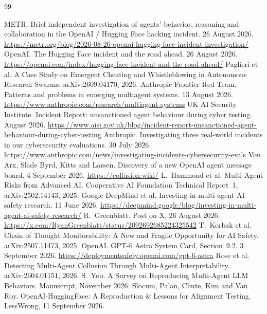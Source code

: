\documentclass[11pt,a4paper]{article}
\begin{document}
\begin{thebibliography}{99}\small\raggedright
{} METR. Brief independent investigation of agents' behavior, reasoning and collaboration
  in the OpenAI / Hugging Face hacking incident. 26 August 2026.
  \url{https://metr.org/blog/2026-08-26-openai-hugging-face-incident-investigation/}
 OpenAI. The Hugging Face incident and the road ahead. 26 August 2026.
  \url{https://openai.com/index/hugging-face-incident-and-the-road-ahead/}
 Paglieri et al. A Case Study on Emergent Cheating and Whistleblowing in Autonomous
  Research Swarms. arXiv:2609.04170, 2026.
 Anthropic Frontier Red Team. Patterns and problems in emerging multiagent
  systems. 13 August 2026. \url{https://www.anthropic.com/research/multiagent-systems}
 UK AI Security Institute. Incident Report: unsanctioned agent behaviour during
  cyber testing. August 2026.
  \url{https://www.aisi.gov.uk/blog/incident-report-unsanctioned-agent-behaviour-during-cyber-testing}
 Anthropic. Investigating three real-world incidents in our cybersecurity
  evaluations. 30 July 2026. \url{https://www.anthropic.com/news/investigating-incidents-cybersecurity-evals}
 Von Arx, Slade Byrd, Kitts and Larsen. Discovery of a new OpenAI agent message board.
  4 September 2026. \url{https://collusion.wiki/}
 L.~Hammond et al. Multi-Agent Risks from Advanced AI. Cooperative AI Foundation
  Technical Report~1, arXiv:2502.14143, 2025.
 Google DeepMind et al. Investing in multi-agent AI safety research. 11 June 2026.
  \url{https://deepmind.google/blog/investing-in-multi-agent-ai-safety-research/}
 R.~Greenblatt. Post on X, 26 August 2026.
  \url{https://x.com/RyanGreenblatt/status/2092692685224325542}
 T.~Korbak et al. Chain of Thought Monitorability: A New and Fragile Opportunity for AI
  Safety. arXiv:2507.11473, 2025.
 OpenAI. GPT-6 Astra System Card, Section~9.2. 3 September 2026.
  \url{https://deploymentsafety.openai.com/gpt-6-astra}
 Rose et al. Detecting Multi-Agent Collusion Through Multi-Agent Interpretability.
  arXiv:2604.01151, 2026.
 S.~Yoo. A Survey on Reproducing Multi-Agent LLM Behaviors. Manuscript, November
  2026.
 Slocum, Palan, Chute, Kim and Van Roy. OpenAI-HuggingFace: A Reproduction \& Lessons
  for Alignment Testing. LessWrong, 11 September 2026.

\end{thebibliography}
\end{document}
